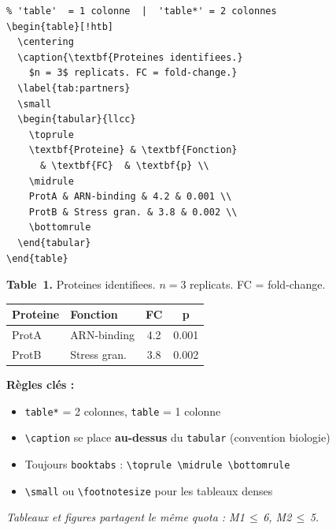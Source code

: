 \documentclass[12pt, a4paper]{article}
\begin{document}
\begin{demo}
\begin{lstlisting}[style=latexcode]
% Caption AVANT le tabular (biologie)
% 'table'  = 1 colonne  |  'table*' = 2 colonnes
\begin{table}[!htb]
  \centering
  \caption{\textbf{Proteines identifiees.}
    $n = 3$ replicats. FC = fold-change.}
  \label{tab:partners}
  \small
  \begin{tabular}{llcc}
    \toprule
    \textbf{Proteine} & \textbf{Fonction}
      & \textbf{FC}  & \textbf{p} \\
    \midrule
    ProtA & ARN-binding & 4.2 & 0.001 \\
    ProtB & Stress gran. & 3.8 & 0.002 \\
    \bottomrule
  \end{tabular}
\end{table}
\end{lstlisting}
\tcblower
\begin{center}
\small \textbf{Table~1.} Proteines identifiees.
$n = 3$ replicats. FC = fold-change.\\[3pt]
\begin{tabular}{llcc}
  \toprule
  \textbf{Proteine} & \textbf{Fonction} & \textbf{FC} & \textbf{p} \\
  \midrule
  ProtA & ARN-binding & 4.2 & 0.001 \\
  ProtB & Stress gran. & 3.8 & 0.002 \\
  \bottomrule
\end{tabular}
\end{center}
\vspace{4pt}
\footnotesize\textbf{Règles clés :}
\begin{itemize}[noitemsep, topsep=2pt]
  \item \texttt{table*} = 2 colonnes, \texttt{table} = 1 colonne
  \item \texttt{\textbackslash caption} se place \textbf{au-dessus} du \texttt{tabular} (convention biologie)
  \item Toujours \texttt{booktabs} : \texttt{\textbackslash toprule \textbackslash midrule \textbackslash bottomrule}
  \item \texttt{\textbackslash small} ou \texttt{\textbackslash footnotesize} pour les tableaux denses
\end{itemize}
\smallskip
\textit{Tableaux et figures partagent le même quota : M1\,$\leqslant$\,6, M2\,$\leqslant$\,5.}
\end{demo}
\end{document}
